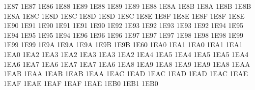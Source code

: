 \setcclcuc 1E87 1E87 1E86 %
\setcclcuc 1E88 1E89 1E88 %
\setcclcuc 1E89 1E89 1E88 %
\setcclcuc 1E8A 1E8B 1E8A %
\setcclcuc 1E8B 1E8B 1E8A %
\setcclcuc 1E8C 1E8D 1E8C %
\setcclcuc 1E8D 1E8D 1E8C %
\setcclcuc 1E8E 1E8F 1E8E %
\setcclcuc 1E8F 1E8F 1E8E %
\setcclcuc 1E90 1E91 1E90 %
\setcclcuc 1E91 1E91 1E90 %
\setcclcuc 1E92 1E93 1E92 %
\setcclcuc 1E93 1E93 1E92 %
\setcclcuc 1E94 1E95 1E94 %
\setcclcuc 1E95 1E95 1E94 %
\setcclcuc 1E96 1E96 1E96 %
\setcclcuc 1E97 1E97 1E97 %
\setcclcuc 1E98 1E98 1E98 %
\setcclcuc 1E99 1E99 1E99 %
\setcclcuc 1E9A 1E9A 1E9A %
\setcclcuc 1E9B 1E9B 1E60 %
\setcclcuc 1EA0 1EA1 1EA0 %
\setcclcuc 1EA1 1EA1 1EA0 %
\setcclcuc 1EA2 1EA3 1EA2 %
\setcclcuc 1EA3 1EA3 1EA2 %
\setcclcuc 1EA4 1EA5 1EA4 %
\setcclcuc 1EA5 1EA5 1EA4 %
\setcclcuc 1EA6 1EA7 1EA6 %
\setcclcuc 1EA7 1EA7 1EA6 %
\setcclcuc 1EA8 1EA9 1EA8 %
\setcclcuc 1EA9 1EA9 1EA8 %
\setcclcuc 1EAA 1EAB 1EAA %
\setcclcuc 1EAB 1EAB 1EAA %
\setcclcuc 1EAC 1EAD 1EAC %
\setcclcuc 1EAD 1EAD 1EAC %
\setcclcuc 1EAE 1EAF 1EAE %
\setcclcuc 1EAF 1EAF 1EAE %
\setcclcuc 1EB0 1EB1 1EB0 %
